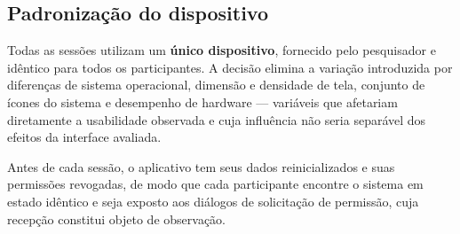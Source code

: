 \subsection{Padronização do dispositivo}

Todas as sessões utilizam um \textbf{único dispositivo}, fornecido pelo
pesquisador e idêntico para todos os participantes. A decisão elimina a variação
introduzida por diferenças de sistema operacional, dimensão e densidade de tela,
conjunto de ícones do sistema e desempenho de hardware --- variáveis que afetariam
diretamente a usabilidade observada e cuja influência não seria separável dos
efeitos da interface avaliada.

Antes de cada sessão, o aplicativo tem seus dados reinicializados e suas permissões
revogadas, de modo que cada participante encontre o sistema em estado idêntico e
seja exposto aos diálogos de solicitação de permissão, cuja recepção constitui
objeto de observação.

%
%

